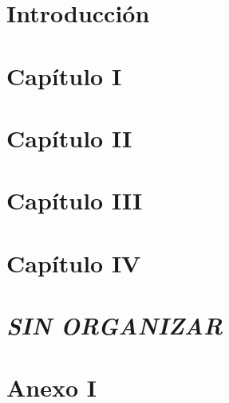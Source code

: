 \documentclass[a4paper,12pt,titlepage]{article}
\begin{document}
  \thispagestyle{empty} %
  \caratula
  \newpage

  \newpage

  \setcounter{secnumdepth}{0}
  \setcounter{tocdepth}{3}
  \setcounter{page}{1}
  
  \newpage
  \tableofcontents
  \newpage

  \section{Introducción}
  
  \newpage
  \setcounter{secnumdepth}{3}
  \section{Capítulo I}
  
  \newpage
  
  \newpage
  \section{Capítulo II}
  
  \newpage
  \section{Capítulo III}
  
  \newpage
  \section{Capítulo IV}
  
  \newpage

  \section{\textit{SIN ORGANIZAR}}
  
  \newpage

  \appendix
  \newpage
  \section{Anexo I}
  
  \newpage
  
  
  \newpage
  \printglossary[title={Glosario de términos}]
  \newpage
  \listoffigures
  \newpage
  \listoftables
\end{document}
